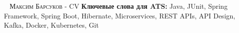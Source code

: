 
\makecvfooterwithkeywords
   {\textsc{\russiancurrentmonth \ \the\year{}}}
   {\textsc{Максим Барсуков - CV}}
   {\thepage}
   {\textbf{Ключевые слова для ATS:} Java, JUnit, Spring Framework, Spring Boot, Hibernate,
                                     Microservices, REST APIs, API Design, Kafka, Docker, Kubernetes, Git}
